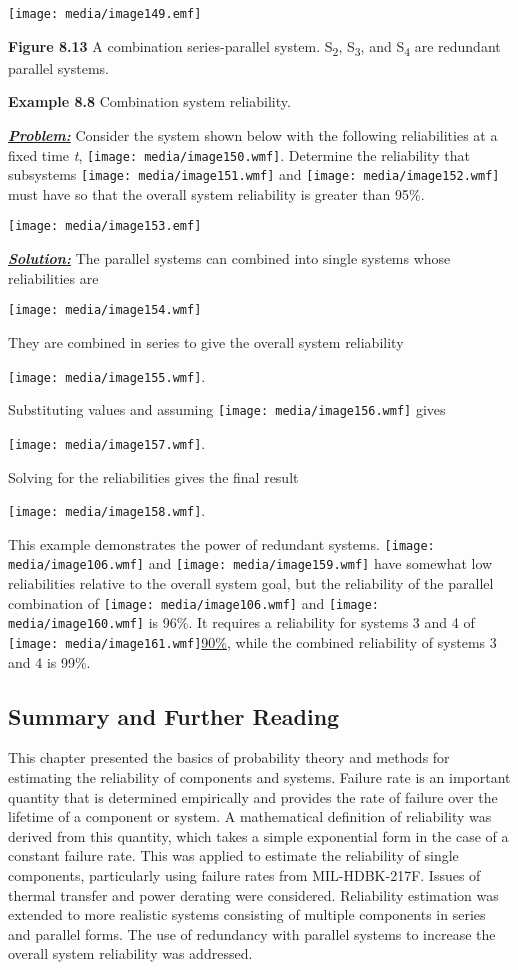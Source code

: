 \texttt{[image: media/image149.emf]}

\textbf{Figure 8.13} A combination series-parallel system.
S\textsubscript{2}, S\textsubscript{3}, and S\textsubscript{4} are
redundant parallel systems.

\textbf{Example 8.8} Combination system reliability.

\emph{\textbf{\ul{Problem:}}} Consider the system shown below with the
following reliabilities at a fixed time \emph{t},
\texttt{[image: media/image150.wmf]}. Determine the reliability that
subsystems \texttt{[image: media/image151.wmf]} and
\texttt{[image: media/image152.wmf]} must have so that the overall
system reliability is greater than 95\%.

\texttt{[image: media/image153.emf]}

\emph{\textbf{\ul{Solution:}}} The parallel systems can combined into
single systems whose reliabilities are

\texttt{[image: media/image154.wmf]}

They are combined in series to give the overall system reliability

\texttt{[image: media/image155.wmf]}.

Substituting values and assuming \texttt{[image: media/image156.wmf]}
gives

\texttt{[image: media/image157.wmf]}.

Solving for the reliabilities gives the final result

\texttt{[image: media/image158.wmf]}.

This example demonstrates the power of redundant systems.
\texttt{[image: media/image106.wmf]} and
\texttt{[image: media/image159.wmf]} have somewhat low reliabilities
relative to the overall system goal, but the reliability of the parallel
combination of \texttt{[image: media/image106.wmf]} and
\texttt{[image: media/image160.wmf]} is 96\%. It requires a reliability
for systems 3 and 4 of \texttt{[image: media/image161.wmf]}\ul{90\%},
while the combined reliability of systems 3 and 4 is 99\%.

\subsection{Summary and Further
Reading}\label{summary-and-further-reading}

This chapter presented the basics of probability theory and methods for
estimating the reliability of components and systems. Failure rate is an
important quantity that is determined empirically and provides the rate
of failure over the lifetime of a component or system. A mathematical
definition of reliability was derived from this quantity, which takes a
simple exponential form in the case of a constant failure rate. This was
applied to estimate the reliability of single components, particularly
using failure rates from MIL-HDBK-217F. Issues of thermal transfer and
power derating were considered. Reliability estimation was extended to
more realistic systems consisting of multiple components in series and
parallel forms. The use of redundancy with parallel systems to increase
the overall system reliability was addressed.

